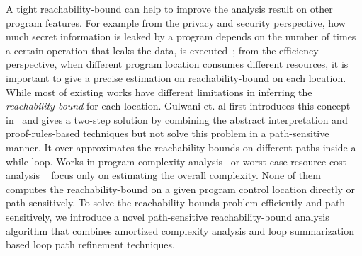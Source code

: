 A tight reachability-bound can help to improve the analysis result on other program features.
For example from the privacy and security perspective,
how much secret information is leaked by a program depends on the number of times a certain operation that leaks the data,
is executed~\cite{Malacaria07};
from the efficiency perspective, when different program location consumes different resources, it is important to give a precise estimation on reachability-bound on each location.
While most of existing works have different limitations in inferring the \emph{reachability-bound} for each location.
Gulwani et. al first introduces this concept in~\cite{GulwaniZ10} and
gives a two-step solution by combining the abstract interpretation and proof-rules-based techniques but not solve this problem in a path-sensitive manner.
It over-approximates the reachability-bounds on different paths inside a while loop.
Works in program complexity analysis~\cite{GustafssonEL05,HumenbergerJK18} or worst-case resource cost analysis
~\cite{BrockschmidtEFFG16,AlbertAGP08,AliasDFG10,Flores-MontoyaH14} focus only on estimating 
the overall complexity.
None of them computes the reachability-bound on a given program control location directly or path-sensitively.
To solve 
the reachability-bounds problem efficiently and path-sensitively, 
we introduce a novel path-sensitive reachability-bound analysis algorithm that combines amortized complexity analysis and loop summarization based loop path refinement techniques. 
